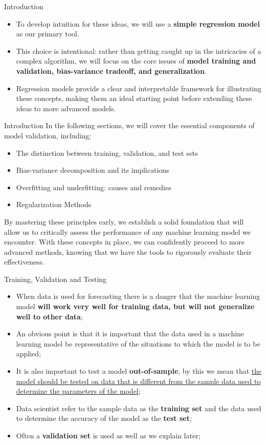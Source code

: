 \documentclass[11pt]{beamer}
\begin{document}
%
%
\begin{frame}{Introduction}
\begin{itemize}
\item To develop intuition for these ideas, we will use a \textbf{simple regression model} as our primary tool. 
\item This choice is intentional: rather than getting caught up in the intricacies of a complex algorithm, we will focus on the core issues of \textbf{model training and validation, bias-variance tradeoff, and generalization}. 
\item Regression models provide a clear and interpretable framework for illustrating these concepts, making them an ideal starting point before extending these ideas to more advanced models.
\end{itemize}
\end{frame}
%
%
\begin{frame}{Introduction}
In the following sections, we will cover the essential components of model validation, including:
\begin{itemize}
\item The distinction between training, validation, and test sets
\item Bias-variance decomposition and its implications
\item Overfitting and underfitting: causes and remedies
\item Regularization Methods
\end{itemize}
By mastering these principles early, we establish a solid foundation that will allow us to critically assess the performance of any machine learning model we encounter. With these concepts in place, we can confidently proceed to more advanced methods, knowing that we have the tools to rigorously evaluate their effectiveness.
\end{frame}
%
%
\begin{frame}{Training, Validation and Testing}
	\begin{itemize}
		\item When data is used for forecasting there is a danger that the machine learning model \textbf{will work very well for training data, but will not generalize well to other data};
		\item An obvious point is that it is important that the data used in a machine learning model be representative of the situations to which the model is to be applied;
		\item It is also important to test a model \textbf{out-of-sample}, by this we mean that \ul{the model should be tested on data that is different from the sample data used to determine the parameters of the model};
		\item Data scientist refer to the sample data as the \textbf{training set} and the data used to determine the accuracy of the model as the \textbf{test set};
		\item Often a \textbf{validation set} is used as well as we explain later;
	\end{itemize}
\end{frame}
\end{document}
